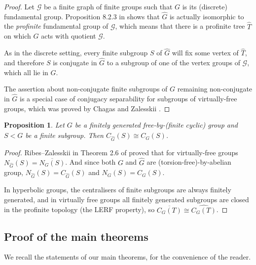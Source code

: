 \documentclass[11pt, a4 paper]{amsart}
\numberwithin{equation}{section}
\newtheorem{proposition}[theorem]{Proposition}
\theoremstyle{remark}
\theoremstyle{definition}
\def\wh{\widehat}
\begin{document}
\begin{proof}
	Let $\mathcal{G}$ be a finite graph of finite groups
	such that $G$ is its (discrete) fundamental group. Proposition 8.2.3 in
	\cite{ribes2017profinite} shows that
	$\widehat G$ is actually isomorphic 
	to the \emph{profinite} fundamental group of $\mathcal{G}$,
	which means that there is a profinite tree $\widehat{T}$ on which $\widehat{G}$ acts 
	with quotient $\mathcal{G}$.
	
	As in the discrete setting, every  finite subgroup $S$ of $\widehat G$
	will fix some vertex  of $\widehat{T}$, and therefore $S$ is conjugate in $\widehat G$
	to a subgroup of one of the vertex groups of $\mathcal{G}$, which all lie in $G$. 
	
	The assertion about non-conjugate finite subgroups of $G$ remaining non-conjugate in $\widehat G$
	is a special case of  conjugacy separability for subgroups of  virtually-free groups, which was
	proved by Chagas and Zalesskii   \cite{chagas2015subgroup}. 
\end{proof}

\begin{proposition}
\label{centralisers}
	Let $G$ be a finitely generated free-by-(finite cyclic) group and $S < G$ be a finite subgroup.
	Then $C_{\widehat{G}}(S) \cong \widehat{C_G(S)}$.
\end{proposition}

\begin{proof}
	Ribes--Zalesskii in Theorem 2.6 of \cite{ribes2014normalizers}
	proved that for virtually-free groups 
	$N_{\widehat G}(S) = \overline{N_G(S)}$. 
	And since both $G$ and $\wh{G}$ are 
	(torsion-free)-by-abelian group, 
	$N_{\widehat G}(S) = C_{\widehat{G}}(S)$ and $N_G(S)=C_G(S)$. 
	
	In hyperbolic groups, the centralisers of finite subgroups 
	are always finitely generated, 
	and in virtually free groups all finitely generated subgroups 
	are closed in the profinite topology (the LERF property), 
	so $\overline{C_G(T)} \cong \widehat{C_G(T)}$. 
\end{proof}


\subsection{Proof of the main theorems} 
\label{sec:proof-of-main-thms}

We recall the statements of our main theorems, 
for the convenience of the reader. 

\thmfinitecyclic*
\end{document}
